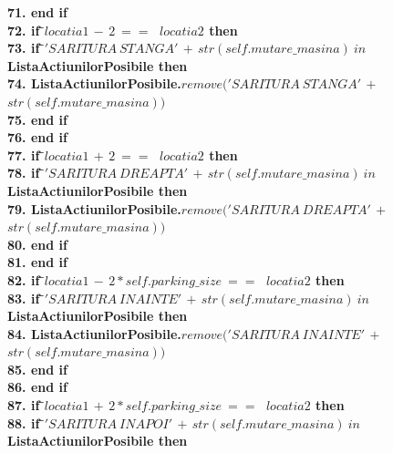\documentclass{article}
\begin{document}
\begin{center}
\begin{tabbing}
\bfseries{71.}\indent\>        \>\textbf{end if}\\
\bfseries{72.}\indent\>       \>\textbf{if } \=$locatia1$ $-$ $ 2 \ == \ $ $ locatia2$ \textbf{ then} \\
\bfseries{73.}\indent\>       \>\>\textbf{if } \=$'SARITURA\ STANGA'$ $+$ $str(self.mutare\_masina) \ in \ $ \textbf{ListaActiunilorPosibile} \textbf{ then} \\
\bfseries{74.}\indent          \> \> \> \>\textbf{ListaActiunilorPosibile}.$remove('SARITURA\ STANGA'$ $+$ $str(self.mutare\_masina))$\\
\bfseries{75.}\indent          \> \>  \>\textbf{end if}\\
\bfseries{76.}\indent\>        \>\textbf{end if}\\
\bfseries{77.}\indent\>       \>\textbf{if } \=$locatia1$ $+$ $ 2 \ == \ $ $ locatia2$ \textbf{ then} \\
\bfseries{78.}\indent\>       \>\>\textbf{if } \=$'SARITURA\ DREAPTA'$ $+$ $str(self.mutare\_masina) \ in \ $ \textbf{ListaActiunilorPosibile} \textbf{ then} \\
\bfseries{79.}\indent          \> \> \> \>\textbf{ListaActiunilorPosibile}.$remove('SARITURA\ DREAPTA'$ $+$ $str(self.mutare\_masina))$\\
\bfseries{80.}\indent          \> \>  \>\textbf{end if}\\
\bfseries{81.}\indent\>        \>\textbf{end if}\\
\bfseries{82.}\indent\>       \>\textbf{if } \=$locatia1$ $-$ $ 2*self.parking\_size \ == \ $ $ locatia2$ \textbf{ then} \\
\bfseries{83.}\indent\>       \>\>\textbf{if } \=$'SARITURA\ INAINTE'$ $+$ $str(self.mutare\_masina) \ in \ $ \textbf{ListaActiunilorPosibile} \textbf{ then} \\
\bfseries{84.}\indent          \> \> \> \>\textbf{ListaActiunilorPosibile}.$remove('SARITURA\ INAINTE'$ $+$ $str(self.mutare\_masina))$\\
\bfseries{85.}\indent          \> \>  \>\textbf{end if}\\
\bfseries{86.}\indent\>        \>\textbf{end if}\\
\bfseries{87.}\indent\>       \>\textbf{if } \=$locatia1$ $+$ $ 2*self.parking\_size \ == \ $ $ locatia2$ \textbf{ then} \\
\bfseries{88.}\indent\>       \>\>\textbf{if } \=$'SARITURA\ INAPOI'$ $+$ $str(self.mutare\_masina) \ in \ $ \textbf{ListaActiunilorPosibile} \textbf{ then} \\

\end{tabbing}
\end{center}
\end{document}
